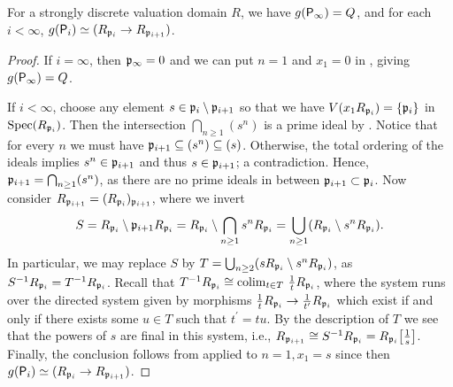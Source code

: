 \documentclass[reqno,a4paper]{amsart}
\begin{document}
\begin{lemma}\label{lem:BF}
For a strongly discrete valuation domain $R$, we have $g(\mathsf{P}_\infty)=Q$, and for each $i<\infty$, $
g(\mathsf{P}_i)\simeq(R_{\mathfrak{p}_i}\to R_{\mathfrak{p}_{i+1}})$.
\end{lemma}
\begin{proof}
If $i=\infty$, then $\mathfrak{p}_\infty=0$ and we can put $n=1$ and $x_1=0$ in , giving $g(\mathsf{P}_\infty)=Q$.

If $i<\infty$, choose any element $s\in\mathfrak{p}_i\setminus\mathfrak{p}_{i+1}$ so that we have $V(x_1R_{\mathfrak{p}_i})=\{\mathfrak{p}_i\}$ in $\operatorname{Spec}(R_{\mathfrak{p}_i})$.
Then the intersection $\bigcap_{n\ge1}(s^n)$ is a prime ideal by \cite[Lemma II.1.3]{fs01}. Notice that for every $n$ we must have  $\mathfrak{p}_{i+1}\subseteq (s^n)\subseteq (s)$. Otherwise, the total ordering of the ideals implies $s^n\in\mathfrak{p}_{i+1}$ and thus $s\in \mathfrak{p}_{i+1}$; a contradiction. Hence, $\mathfrak{p}_{i+1}= \bigcap_{n\ge1}(s^n)$, as there are no prime ideals in between $\mathfrak{p}_{i+1}\subset \mathfrak{p}_i$. Now consider $R_{\mathfrak{p}_{i+1}}=(R_{\mathfrak{p}_{i}})_{\mathfrak{p}_{i+1}}$, where we invert
\begin{equation*}
   S=R_{\mathfrak{p}_{i}}\setminus \mathfrak{p}_{i+1}R_{\mathfrak{p}_{i}}=R_{\mathfrak{p}_{i}}\setminus \bigcap\limits_{n\ge1}s^nR_{\mathfrak{p}_{i}}=\bigcup\limits_{n\ge1}(R_{\mathfrak{p}_{i}}\setminus s^nR_{\mathfrak{p}_{i}}). 
\end{equation*}
In particular, we may replace $S$ by $T=\bigcup_{n\ge2}(sR_{\mathfrak{p}_{i}}\setminus s^nR_{\mathfrak{p}_{i}})$, as $S^{-1}R_{\mathfrak{p}_{i}}=T^{-1}R_{\mathfrak{p}_{i}}$. Recall that $T^{-1}R_{\mathfrak{p}_{i}}\cong \operatorname{colim}_{t\in T}\, \frac{1}{t}R_{\mathfrak{p}_{i}}$, where the system runs over the directed system given by morphisms $\frac{1}{t}R_{\mathfrak{p}_{i}}\to\frac{1}{t'}R_{\mathfrak{p}_{i}}$ which exist if and only if there exists some $u\in T$ such that $t^\prime=tu$. By the description of $T$ we see that the powers of $s$ are final in this system, i.e., $R_{\mathfrak{p}_{i+1}}\cong S^{-1}R_{\mathfrak{p}_{i}}=R_{\mathfrak{p}_{i}}\big[\frac{1}{s}\big]$.
Finally, the conclusion follows from  applied to $n=1, x_1=s$ since then
$g(\mathsf{P}_i)\simeq(R_{\mathfrak{p}_i}\to R_{\mathfrak{p}_{i+1}})$.
\end{proof}
\end{document}

